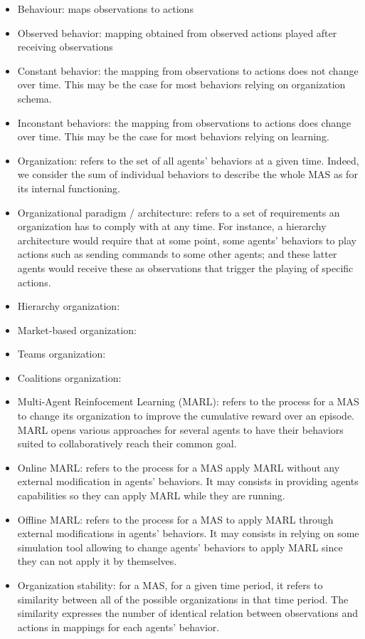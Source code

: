 \documentclass[conference]{IEEEtran}
\begin{document}
    \begin{itemize}
        \item Behaviour: maps observations to actions
    \item Observed behavior: mapping obtained from observed actions played after receiving observations
    \item Constant behavior: the mapping from observations to actions does not change over time. This may be the case for most behaviors relying on organization schema.
    \item Inconstant behaviors: the mapping from observations to actions does change over time. This may be the case for most behaviors relying on learning.
    \item Organization: refers to the set of all agents' behaviors at a given time. Indeed, we consider the sum of individual behaviors to describe the whole MAS as for its internal functioning. 
    \item Organizational paradigm / architecture: refers to a set of requirements an organization has to comply with at any time. For instance, a hierarchy architecture would require that at some point, some agents' behaviors to play actions such as sending commands to some other agents; and these latter agents would receive these as observations that trigger the playing of specific actions.
    \item Hierarchy organization: 
    \item Market-based organization: 
    \item Teams organization: 
    \item Coalitions organization: 
    \item Multi-Agent Reinfocement Learning (MARL): refers to the process for a MAS to change its organization to improve the cumulative reward over an episode. MARL opens various approaches for several agents to have their behaviors suited to collaboratively reach their common goal.
    \item Online MARL: refers to the process for a MAS apply MARL without any external modification in agents' behaviors. It may consists in providing agents capabilities so they can apply MARL while they are running. 
    \item Offline MARL: refers to the process for a MAS to apply MARL through external modifications in agents' behaviors. It may consists in relying on some simulation tool allowing to change agents' behaviors to apply MARL since they can not apply it by themselves.
    \item Organization stability: for a MAS, for a given time period, it refers to similarity between all of the possible organizations in that time period. The similarity expresses the number of identical relation between observations and actions in mappings for each agents' behavior.

\end{itemize}
\end{document}

